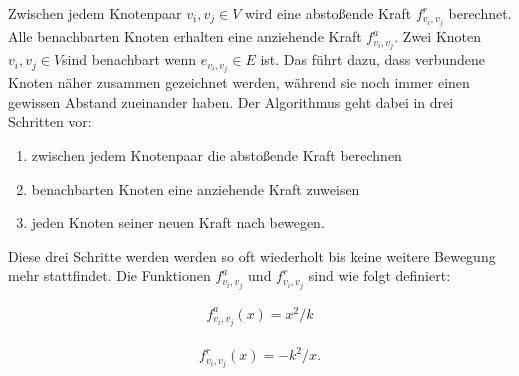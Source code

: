 Zwischen jedem Knotenpaar $v_{i},v_{j} \in V$ wird eine abstoßende Kraft \begin{math} f^{r}_{v_{i},v_{j}}  \end{math} berechnet.   Alle
benachbarten Knoten erhalten eine anziehende Kraft \begin{math} f^{a}_{v_{i},v_{j}} \end{math}. Zwei Knoten \begin{math} v_{i},v_{j} \in V \end{math}sind benachbart wenn \begin{math} e_{v_{i},v_{j}} \in E \end{math} ist. Das führt dazu, dass verbundene Knoten näher zusammen
gezeichnet werden, während sie noch immer einen gewissen Abstand zueinander
haben. Der Algorithmus geht dabei in drei Schritten vor:

\begin{enumerate}
	\item zwischen jedem Knotenpaar die abstoßende Kraft berechnen
	\item benachbarten Knoten eine anziehende Kraft zuweisen
	\item jeden Knoten seiner neuen Kraft nach bewegen.
\end{enumerate} 
Diese drei Schritte werden werden so oft wiederholt bis keine weitere Bewegung mehr stattfindet.
Die Funktionen \begin{math} f^{a}_{v_{i},v_{j}} \end{math} und \begin{math} f^{r}_{v_{i},v_{j}} \end{math} sind wie folgt definiert:


\begin{align}
	f^{a}_{v_{i},v_{j}} (x) =
	x^{2}/k
\end{align}

\begin{align}
	f^{r}_{v_{i},v_{j}} (x) =
	-k^{2}/x.
\end{align}


